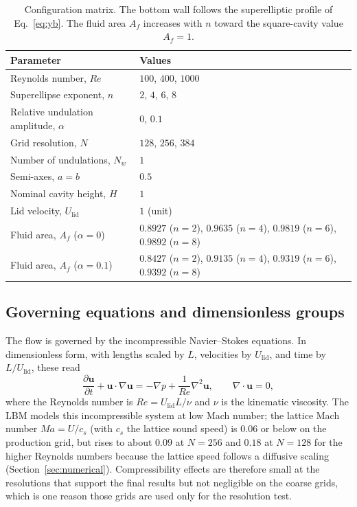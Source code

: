 \begin{table}[t]
\centering
\caption{Configuration matrix. The bottom wall follows the superelliptic profile of Eq.~\eqref{eq:yb}. The fluid area $A_f$ increases with $n$ toward the square-cavity value $A_f=1$.}
\label{tab:geometry}
\begin{tabular}{@{}ll@{}}
\hline
Parameter & Values \\
\hline
Reynolds number, $Re$ & $100$, $400$, $1000$ \\
Superellipse exponent, $n$ & $2$, $4$, $6$, $8$ \\
Relative undulation amplitude, $\alpha$ & $0$, $0.1$ \\
Grid resolution, $N$ & $128$, $256$, $384$ \\
Number of undulations, $N_w$ & $1$ \\
Semi-axes, $a=b$ & $0.5$ \\
Nominal cavity height, $H$ & $1$ \\
Lid velocity, $U_{\mathrm{lid}}$ & $1$ (unit) \\
\hline
Fluid area, $A_f$ ($\alpha=0$) & $0.8927$ ($n{=}2$), $0.9635$ ($n{=}4$), $0.9819$ ($n{=}6$), $0.9892$ ($n{=}8$) \\
Fluid area, $A_f$ ($\alpha=0.1$) & $0.8427$ ($n{=}2$), $0.9135$ ($n{=}4$), $0.9319$ ($n{=}6$), $0.9392$ ($n{=}8$) \\
\hline
\end{tabular}
\end{table}


\subsection{Governing equations and dimensionless groups}
\label{subsec:governing}

The flow is governed by the incompressible Navier--Stokes equations. In dimensionless form, with lengths scaled by $L$, velocities by $U_{\mathrm{lid}}$, and time by $L/U_{\mathrm{lid}}$, these read
\begin{equation}
\frac{\partial \mathbf{u}}{\partial t} + \mathbf{u}\cdot\nabla\mathbf{u} = -\nabla p + \frac{1}{Re}\nabla^2\mathbf{u}, \qquad \nabla\cdot\mathbf{u}=0,
\label{eq:NS}
\end{equation}
where the Reynolds number is $Re = U_{\mathrm{lid}} L/\nu$ and $\nu$ is the kinematic viscosity. The LBM models this incompressible system at low Mach number; the lattice Mach number $Ma = U/c_s$ (with $c_s$ the lattice sound speed) is $0.06$ or below on the production grid, but rises to about $0.09$ at $N=256$ and $0.18$ at $N=128$ for the higher Reynolds numbers because the lattice speed follows a diffusive scaling (Section~\ref{sec:numerical}). Compressibility effects are therefore small at the resolutions that support the final results but not negligible on the coarse grids, which is one reason those grids are used only for the resolution test.

